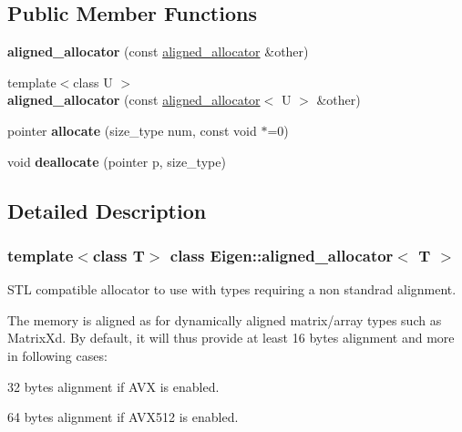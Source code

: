 \subsection*{Public Member Functions}
\begin{DoxyCompactItemize}
\item 
\mbox{\label{class_eigen_1_1aligned__allocator_a7076a7a6ccb57759a910860135253543}} 
{\bfseries aligned\+\_\+allocator} (const \mbox{\hyperlink{class_eigen_1_1aligned__allocator}{aligned\+\_\+allocator}} \&other)
\item 
\mbox{\label{class_eigen_1_1aligned__allocator_a19b1a156baf134359d088dc9127fc2c1}} 
{\footnotesize template$<$class U $>$ }\\{\bfseries aligned\+\_\+allocator} (const \mbox{\hyperlink{class_eigen_1_1aligned__allocator}{aligned\+\_\+allocator}}$<$ U $>$ \&other)
\item 
\mbox{\label{class_eigen_1_1aligned__allocator_a11f921b8c551f8f89c5b6252a2cbfac0}} 
pointer {\bfseries allocate} (size\+\_\+type num, const void $\ast$=0)
\item 
\mbox{\label{class_eigen_1_1aligned__allocator_ae00326806b7ba19c141c6c61a5f7b1ad}} 
void {\bfseries deallocate} (pointer p, size\+\_\+type)
\end{DoxyCompactItemize}


\subsection{Detailed Description}
\subsubsection*{template$<$class T$>$\newline
class Eigen\+::aligned\+\_\+allocator$<$ T $>$}

S\+TL compatible allocator to use with types requiring a non standrad alignment. 

The memory is aligned as for dynamically aligned matrix/array types such as Matrix\+Xd. By default, it will thus provide at least 16 bytes alignment and more in following cases\+:
\begin{DoxyItemize}
\item 32 bytes alignment if A\+VX is enabled.
\item 64 bytes alignment if A\+V\+X512 is enabled.
\end{DoxyItemize}


